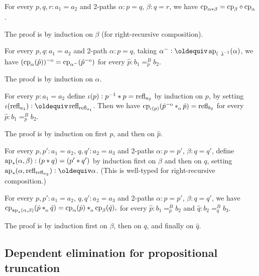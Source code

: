 \documentclass[a4paper,12pt]{amsart}
\begin{document}
\begin{lemma}\label{lem:functorial-change-path}
  For every $p,q,r:a_1=a_2$ and 2-paths $\alpha : p = q$, $\beta : q = r$,
  we have $\mathrm{cp}_{\alpha*\beta}=\mathrm{cp}_{\beta}\circ\mathrm{cp}_{\alpha}$.
\end{lemma}

The proof is by induction on $\beta$ (for right-recursive composition).

\begin{lemma}\label{lem:inv2-change-path}
  For every  $p,q:a_1=a_2$ and 2-path $\alpha : p = q$, taking
  $\alpha^- \defeq \ap{(\blank)^{-1}}(\alpha)$, we have
  $(\mathrm{cp}_{\alpha}(\hat p))^{-\mathrm{o}} = \mathrm{cp}_{\alpha^-}(\hat p^{-\mathrm{o}})$
  for every $\hat p: b_1=^B_p b_2$.
\end{lemma}
 The proof is by induction on $\alpha$.

\begin{lemma}\label{lem:invlaw-change-path}
  For every  $p :a_1 = a_2$ define $\iota(p): p^{-1}* p = \mathop{{\mathrm{refl}}_{a_2}}$
  by induction on $p$, by setting $\iota(\refl{a_1})\defeq \refl{\refl{a_1}}$.
  Then we have $\cp{\iota(p)}(\hat p\invo \cto {\hat p}) = \refl{b_2}$
  for every $\hat p: b_1=^B_p b_2$.
\end{lemma}
 The proof is by induction on first $p$, and then on $\hat p$.


\begin{definition}\label{lem:compo-ap-ap}
  For every  $p,p':a_1=a_2$, $q,q':a_2=a_3$ and 2-paths
  $\alpha : p = p'$, $\beta : q = q'$, define
  $\mathop{\mathrm{ap}_{*}}(\alpha,\beta): (p* q)=(p'* q')$ by induction
  first on $\beta$ and then on $q$,
  setting $\apc(\alpha,\refl{\refl{a_2}}) \defeq \alpha$.
  (This is well-typed for right-recursive composition.)
\end{definition}

\begin{lemma}\label{lem:compo-change-path}
  For every  $p,p':a_1=a_2$, $q,q':a_2=a_3$ and 2-paths
  $\alpha : p = p'$, $\beta : q = q'$, we have
  $\cp{\apc(\alpha,\beta)}(\hat p \cto \hat q) =
   \cp{\alpha}(\hat p) \cto  \cp{\beta}(\hat q),$
  for every $\hat p: b_1=^B_p b_2$ and $\hat q: b_2=^B_q b_3$.
\end{lemma}
 The proof is by induction first on $\beta$, then on $q$, and finally on $\hat q$.

\subsection{Dependent elimination for propositional truncation}\label{sec:proptrunc}
\end{document}
